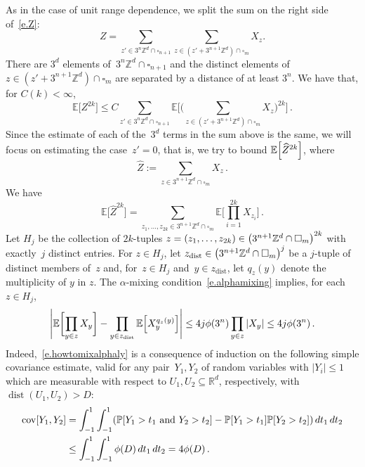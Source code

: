 \documentclass[11pt]{article} %
\let\oldsquare\square %
\renewcommand{\square}{\oldsquare}
\numberwithin{equation}{section}
\theoremstyle{definition}
\let\originalleft\left
\let\originalright\right
\renewcommand{\left}{\mathopen{}\mathclose\bgroup\originalleft}
\renewcommand{\right}{\aftergroup\egroup\originalright}
\newcommand*{\Zd}{\ensuremath{\mathbb{Z}^d}}
\newcommand*{\Rd}{\ensuremath{\mathbb{R}^d}}
\renewcommand*{\hat}{\widehat}
\newcommand{\cu}{\square}
\renewcommand{\P}{\mathbb{P}}
\newcommand{\E}{\mathbb{E}}
\DeclareMathOperator{\dist}{dist}
\DeclareMathOperator{\cov}{cov}
\begin{document}
As in the case of unit range dependence, we split the sum on the right side of~\eqref{e.Z}:
\begin{equation}
Z = \sum_{z'\in 3^n\Zd \cap \cu_{n+1}} \sum_{z\in (z'+3^{n+1}\Zd)\cap \cu_m} X_z.
\end{equation}
There are $3^d$ elements of~$3^n\Zd \cap \cu_{n+1}$ and the distinct elements of~$z\in (z'+3^{n+1}\Zd)\cap \cu_m$ are separated by a distance of at least $3^n$. We have that, for $C(k)<\infty$, 
\begin{equation}
\E\bigl[ Z^{2k} \bigr] 
\leq 
C\sum_{z'\in 3^n\Zd \cap \cu_{n+1}}
\E \Biggl[ 
\biggl( \sum_{z\in (z'+3^{n+1}\Zd)\cap \cu_m} X_z \biggr)^{\!\! 2k} 
\Biggr]
\,.
\end{equation}
Since the estimate of each of the~$3^d$ terms in the sum above is the same, we will focus on estimating the case~$z'=0$, that is, we try to bound $\E \left[ \hat{Z}^{2k} \right]$, where 
\begin{equation}
\hat{Z}:= \sum_{z\in  3^{n+1}\Zd \cap \cu_m} X_z
\,.  
\end{equation}
We have 
\begin{equation*} \label{}
\E \bigl[ \hat{Z}^{2k} \bigr]
=
\sum_{z_1,\ldots,z_{2k} \in 3^{n+1}\Zd\cap \cu_m} \E \biggl[ \prod_{i=1}^{2k} X_{z_i} \biggr]
\,.  
\end{equation*}
Let $H_j$ be the collection of $2k$-tuples $z = (z_1,\ldots,z_{2k}) \in \left( 3^{n+1}\Zd\cap \cu_m \right)^{2k}$ with exactly~$j$ distinct entries. For $z \in H_j$, let $z_{\mathrm{dist}} \in \left( 3^{n+1}\Zd\cap \cu_m \right)^{j}$ be a $j$-tuple of distinct members of~$z$ and, for~$z \in H_j$ and~$y \in z_{\mathrm{dist}}$, let $q_z(y)$ denote the multiplicity of $y$ in $z$. The $\alpha$-mixing condition~\eqref{e.alphamixing} implies, for each~$z \in H_j$,
\begin{equation} 
\label{e.howtomixalphaly}
\Biggl| 
\E \biggl[ \prod_{y\in  z}  X_{y} \biggr]
-
\prod_{y \in z_{\mathrm{dist}}} \E \left[ X_{y}^{q_z(y)} \right]
\Biggr|
\leq 
4 j  \phi(3^n)  \prod_{y\in z} |  X_{y} |
\leq 
4 j  \phi(3^n)
\,.
\end{equation}
Indeed,~\eqref{e.howtomixalphaly} is a consequence of induction on the following simple covariance estimate, valid for any pair~$Y_1,Y_2$ of random variables with $|Y_i| \leq 1$ which are measurable with respect to $U_1,U_2\subseteq\Rd$, respectively, with $\dist(U_1,U_2)> D$:
\begin{align*}
\cov\left[Y_1,Y_2 \right]
&
=
\int_{-1}^1\int_{-1}^1
\left( \P \left[ Y_1>t_1 \ \mbox{and} \ Y_2>t_2 \right] 
-
\P \left[ Y_1>t_1\right]\P \left[ Y_2>t_2\right]
\right)\,dt_1\,dt_2
\\ & 
\leq 
\int_{-1}^1\int_{-1}^1 \phi(D) \,dt_1\,dt_2 = 4\phi(D)
\,.
\end{align*}
\end{document}

